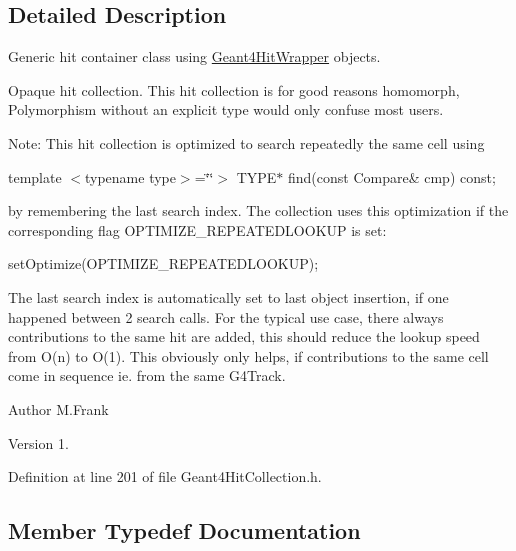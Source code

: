 \subsection{Detailed Description}
Generic hit container class using \hyperlink{class_d_d4hep_1_1_simulation_1_1_geant4_hit_wrapper}{Geant4\+Hit\+Wrapper} objects. 

Opaque hit collection. This hit collection is for good reasons homomorph, Polymorphism without an explicit type would only confuse most users.

Note\+: This hit collection is optimized to search repeatedly the same cell using

template $<$typename type$>$=\char`\"{}\char`\"{}$>$ T\+Y\+P\+E$\ast$ find(const Compare\& cmp) const;

by remembering the last search index. The collection uses this optimization if the corresponding flag O\+P\+T\+I\+M\+I\+Z\+E\+\_\+\+R\+E\+P\+E\+A\+T\+E\+D\+L\+O\+O\+K\+UP is set\+:

set\+Optimize(\+O\+P\+T\+I\+M\+I\+Z\+E\+\_\+\+R\+E\+P\+E\+A\+T\+E\+D\+L\+O\+O\+K\+U\+P);

The last search index is automatically set to last object insertion, if one happened between 2 search calls. For the typical use case, there always contributions to the same hit are added, this should reduce the lookup speed from O(n) to O(1). This obviously only helps, if contributions to the same cell come in sequence ie. from the same G4\+Track.

\begin{DoxyAuthor}{Author}
M.\+Frank 
\end{DoxyAuthor}
\begin{DoxyVersion}{Version}
1. 
\end{DoxyVersion}


Definition at line 201 of file Geant4\+Hit\+Collection.\+h.



\subsection{Member Typedef Documentation}
\hypertarget{class_d_d4hep_1_1_simulation_1_1_geant4_hit_collection_a0d4d87fb90cf83dceff0b43928426135}{}\label{class_d_d4hep_1_1_simulation_1_1_geant4_hit_collection_a0d4d87fb90cf83dceff0b43928426135} 
